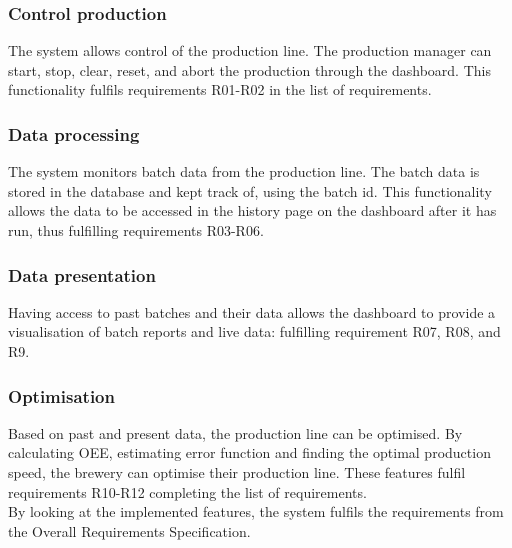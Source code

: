 \subsubsection{Control production} 
The system allows control of the production line. The production manager can
start, stop, clear, reset, and abort the production through the dashboard. This
functionality fulfils requirements R01-R02 in the list of requirements.

\subsubsection{Data processing}
The system monitors batch data from the production line. The batch data is
stored in the database and kept track of, using the batch id. This functionality
allows the data to be accessed in the history page on the dashboard after it has
run, thus fulfilling requirements R03-R06.

\subsubsection{Data presentation}
Having access to past batches and their data allows the dashboard to provide a
visualisation of batch reports and live data: fulfilling requirement R07, R08,
and R9.

\subsubsection{Optimisation}
Based on past and present data, the production line can be optimised. By
calculating OEE, estimating error function and finding the optimal production
speed, the brewery can optimise their production line. These features fulfil
requirements R10-R12 completing the list of requirements. \\

By looking at the implemented features, the system fulfils the requirements from
the Overall Requirements Specification.
